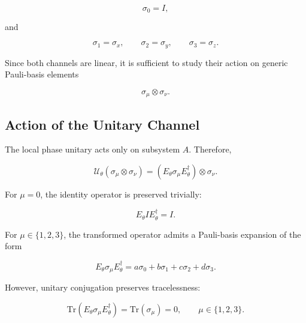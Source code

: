 \[
\sigma_0 = I,
\]

and

\[
\sigma_1=\sigma_x,
\qquad
\sigma_2=\sigma_y,
\qquad
\sigma_3=\sigma_z.
\]

\medskip

Since both channels are linear, it is sufficient to study their action on generic Pauli-basis elements

\[
\sigma_{\mu}
\otimes
\sigma_{\nu}.
\]


\subsection*{Action of the Unitary Channel}

The local phase unitary acts only on subsystem \( A \). Therefore,

\begin{equation}
\mathcal{U}_{\theta}
\left(
\sigma_{\mu}\otimes\sigma_{\nu}
\right)
=
\left(
E_{\theta}\sigma_{\mu}E_{\theta}^{\dagger}
\right)
\otimes
\sigma_{\nu}.
\label{eq:appendix_unitary_pauli_action}
\end{equation}

\medskip

For \( \mu = 0 \), the identity operator is preserved trivially:

\begin{equation}
E_{\theta}IE_{\theta}^{\dagger}
=
I.
\end{equation}

\medskip

For \( \mu \in \{1,2,3\} \), the transformed operator admits a Pauli-basis expansion of the form

\begin{equation}
E_{\theta}\sigma_{\mu}E_{\theta}^{\dagger}
=
a\sigma_0
+
b\sigma_1
+
c\sigma_2
+
d\sigma_3.
\label{eq:appendix_general_pauli_expansion}
\end{equation}

\medskip

However, unitary conjugation preserves tracelessness:

\begin{equation}
\mathrm{Tr}
\left(
E_{\theta}\sigma_{\mu}E_{\theta}^{\dagger}
\right)
=
\mathrm{Tr}(\sigma_{\mu})
=
0,
\qquad
\mu\in\{1,2,3\}.
\label{eq:appendix_trace_preservation}
\end{equation}

